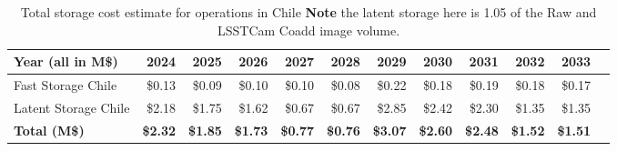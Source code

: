 \tiny \begin{longtable} { |p{}  |r  |r  |r  |r  |r  |r  |r  |r  |r  |r  |r |} 
\caption{Total storage cost estimate for operations in Chile  {\bf Note} the latent storage here is 1.05 of the Raw and LSSTCam Coadd image volume. \label{tab:opsStorageChile}}\\ 
\hline 
\textbf{Year (all in M\$)}&\textbf{2024}&\textbf{2025}&\textbf{2026}&\textbf{2027}&\textbf{2028}&\textbf{2029}&\textbf{2030}&\textbf{2031}&\textbf{2032}&\textbf{2033} \\ \hline
{Fast Storage Chile}&{\$0.13}&{\$0.09}&{\$0.10}&{\$0.10}&{\$0.08}&{\$0.22}&{\$0.18}&{\$0.19}&{\$0.18}&{\$0.17} \\ \hline
{Latent Storage Chile}&{\$2.18}&{\$1.75}&{\$1.62}&{\$0.67}&{\$0.67}&{\$2.85}&{\$2.42}&{\$2.30}&{\$1.35}&{\$1.35} \\ \hline
\textbf{Total (M\$)}&\textbf{\$2.32}&\textbf{\$1.85}&\textbf{\$1.73}&\textbf{\$0.77}&\textbf{\$0.76}&\textbf{\$3.07}&\textbf{\$2.60}&\textbf{\$2.48}&\textbf{\$1.52}&\textbf{\$1.51} \\ \hline
\end{longtable} \normalsize

